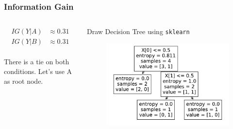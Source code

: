 \documentclass[aspectratio=169, 10pt]{beamer}
\begin{document}
\begin{frame}
    \frametitle{Information Gain}
    \small
    


    \begin{columns}
        \begin{column}{0.5\textwidth}
            \[
                \begin{split}
                    IG(Y | A) & \approx 0.31\\
                    IG(Y | B) & \approx 0.31\\
                \end{split}
            \]
            
            There is a tie on both conditions. Let's use A as root node.
        \end{column}
        \begin{column}{0.5\textwidth}
            Draw Decision Tree using \texttt{sklearn}
            \begin{figure}
                \centering
                \includegraphics[width=\columnwidth]{../plots/tree_logic_01.pdf}
            \end{figure}
        \end{column}
    \end{columns}

\end{frame}
\end{document}
